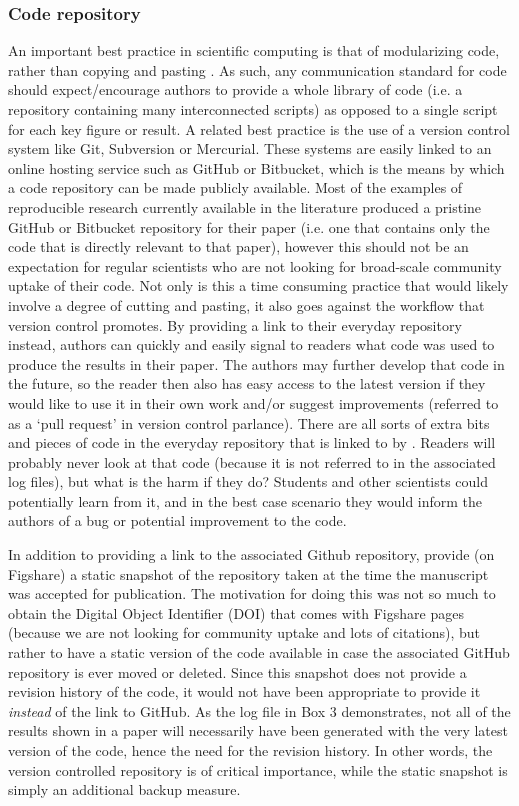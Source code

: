 \subsubsection{Code repository}

An important best practice in scientific computing is that of modularizing code, rather than copying and pasting \citep{Wilson2014a}. As such, any communication standard for code should expect/encourage authors to provide a whole library of code (i.e. a repository containing many interconnected scripts) as opposed to a single script for each key figure or result. A related best practice is the use of a version control system like Git, Subversion or Mercurial. These systems are easily linked to an online hosting service such as GitHub or Bitbucket, which is the means by which a code repository can be made publicly available. Most of the examples of reproducible research currently available in the literature produced a pristine GitHub or Bitbucket repository for their paper (i.e. one that contains only the code that is directly relevant to that paper), however this should not be an expectation for regular scientists who are not looking for broad-scale community uptake of their code. Not only is this a time consuming practice that would likely involve a degree of cutting and pasting, it also goes against the workflow that version control promotes. By providing a link to their everyday repository instead, authors can quickly and easily signal to readers what code was used to produce the results in their paper. The authors may further develop that code in the future, so the reader then also has easy access to the latest version if they would like to use it in their own work and/or suggest improvements (referred to as a `pull request' in version control parlance). There are all sorts of extra bits and pieces of code in the everyday repository that is linked to by \citet{Irving2016}. Readers will probably never look at that code (because it is not referred to in the associated log files), but what is the harm if they do? Students and other scientists could potentially learn from it, and in the best case scenario they would inform the authors of a bug or potential improvement to the code.        

In addition to providing a link to the associated Github repository, \citet{Irving2016} provide (on Figshare) a static snapshot of the repository taken at the time the manuscript was accepted for publication. The motivation for doing this was not so much to obtain the Digital Object Identifier (DOI) that comes with Figshare pages (because we are not looking for community uptake and lots of citations), but rather to have a static version of the code available in case the associated GitHub repository is ever moved or deleted. Since this snapshot does not provide a revision history of the code, it would not have been appropriate to provide it \textit{instead} of the link to GitHub. As the log file in Box 3 demonstrates, not all of the results shown in a paper will necessarily have been generated with the very latest version of the code, hence the need for the revision history. In other words, the version controlled repository is of critical importance, while the static snapshot is simply an additional backup measure.  

